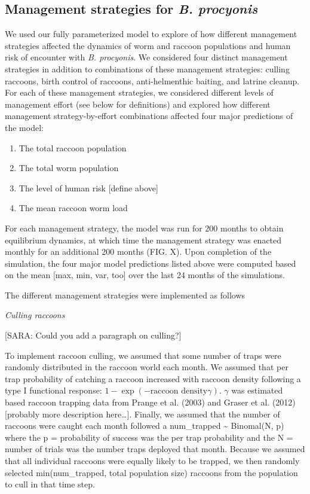 \documentclass[11pt]{article}
\begin{document}
\subsection{Management strategies for \emph{B. procyonis}}

We used our fully parameterized model to explore of how different
management strategies affected the dynamics of worm and raccoon
populations and human risk of encounter with \emph{B. procyonis}. We considered four
distinct management strategies in addition to combinations of these
management strategies: culling raccoons, birth control of raccoons,
anti-helmenthic baiting, and latrine cleanup. For each of these
management strategies, we considered different levels of management
effort (see below for definitions) and explored how different management
strategy-by-effort combinations affected four major predictions of the
model: 

\begin{enumerate}
    \item The total raccoon population 
    \item The total worm population
    \item The level of human risk [define above]
    \item The mean raccoon worm load
\end{enumerate}

For each management strategy, the model was run for 200 months to
obtain equilibrium dynamics, at which time the management strategy was
enacted monthly for an additional 200 months (FIG. X). Upon completion
of the simulation, the four major model predictions listed above were
computed based on the mean [max, min, var, too] over the last 24
months of the simulations.

The different management strategies were implemented as follows

\bigskip
\noindent
\emph{Culling raccoons}

[SARA: Could you add a paragraph on culling?]

To implement raccoon culling, we assumed that some number of traps were
randomly distributed in the raccoon world each month. We assumed that
per trap probability of catching a raccoon increased with raccoon
density following a type I functional response: $1 - \exp(-\text{raccoon
density} \gamma)$. $\gamma$ was estimated
based raccoon trapping data from  Prange et al. (2003) and Graser et al.
(2012) {[}probably more description here\ldots{}{]}. Finally, we assumed
that the number of raccoons were caught each month followed a
num\_trapped \textasciitilde{} Binomal(N, p) where the p = probability
of success was the per trap probability and the N = number of trials was
the number traps deployed that month. Because we assumed that all
individual raccoons were equally likely to be trapped, we then randomly
selected min(num\_trapped, total population size) raccoons from the
population to cull in that time step.
\end{document}
